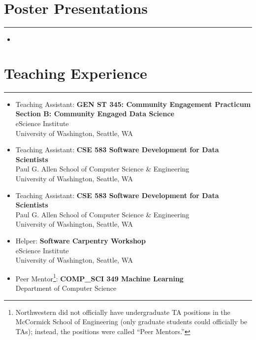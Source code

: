 \documentclass{article}
\begin{document}
\section*{Poster Presentations}
\hrule
\vspace{10pt}

\begin{itemize}[leftmargin=1.5in]
    \item[2023] 
\end{itemize}

\section*{Teaching Experience}
\hrule
\vspace{10pt}

\begin{itemize}[leftmargin=1.5in]
    \item[(Expected) Winter 2027] Teaching Assistant: \textbf{GEN ST 345: Community Engagement Practicum Section B: Community Engaged Data Science}\\
    eScience Institute\\
    University of Washington, Seattle, WA
    \item[Fall 2026] Teaching Assistant: \textbf{CSE 583 Software Development for Data Scientists}\\
    Paul G. Allen School of Computer Science \& Engineering\\
    University of Washington, Seattle, WA
    \item[Fall 2025] Teaching Assistant: \textbf{CSE 583 Software Development for Data Scientists}\\
    Paul G. Allen School of Computer Science \& Engineering\\
    University of Washington, Seattle, WA
    \item[May 2025] Helper: \textbf{Software Carpentry Workshop}\\
    eScience Institute\\
    University of Washington, Seattle, WA
    \item[Summer 2024] Peer Mentor\footnote{Northwestern did not officially have undergraduate TA positions in the McCormick School of Engineering (only graduate students could officially be TAs); instead, the positions were called ``Peer Mentors.''}: \textbf{COMP\_SCI 349 Machine Learning}\\
    Department of Computer Science\\

\end{itemize}
\end{document}
